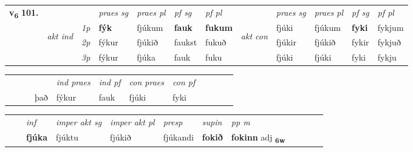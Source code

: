 \begin{tabular}{llllllllllll} \toprule
\multirow{4}{*}{{{\textbf{v{\textsubscript{6}}} \Large{\textbf{101.}}}}}  & &   &  \textit{praes sg}  & \textit{praes pl}  &\textit{ pf sg} & \textit{pf pl} &  &  \textit{praes sg}  & \textit{praes pl}  & \textit{pf sg} & \textit{pf pl } \\*
	\cmidrule{4-7} \cmidrule{9-12}
 & \multirow{3}{*}{\begin{turn}{90}\textit{akt ind}\end{turn}} & {\textit{1p}} & \textbf{fýk} & fjúkum    & \textbf{fauk} & \textbf{fukum} & \multirow{3}{*}{\begin{turn}{90}\textit{akt con}\end{turn}} &fjúki & fjúkum & \textbf{fyki} & fykjum\\*
& &  {\textit{2p}} &  fýkur  & fjúkið   & faukst & fukuð & & fjúkir & fjúkið & fykir & fykjuð \\*
& &  {\textit{3p}} & fýkur & fjúka   & fauk & fuku & & fjúki & fjúki& fyki & fykju  \\*
\cmidrule{4-7} \cmidrule{9-12}
\end{tabular}


\begin{tabular}{llllllllllll}
 & &  & &  \textit{ind praes} & \textit{ind pf} & \textit{con praes} & \textit{con pf} \\*
&  & & það & fýkur & fauk & fjúki & fyki \\*
\cmidrule{5-9}
\end{tabular}


\begin{tabular}{llllllllllll}
 & & \textit{inf} & \textit{imper akt sg} & \textit{imper akt pl}   & \textit{presp} & \textit{supin}  & \textit{pp m}     \\*
  & & \textbf{fjúka} & fjúktu  & fjúkið   & fjúkandi &  \textbf{fokið}  & \textbf{fokinn} adj \textbf{\textsubscript{6w}} \\*
\cmidrule{1-12}
\end{tabular}



